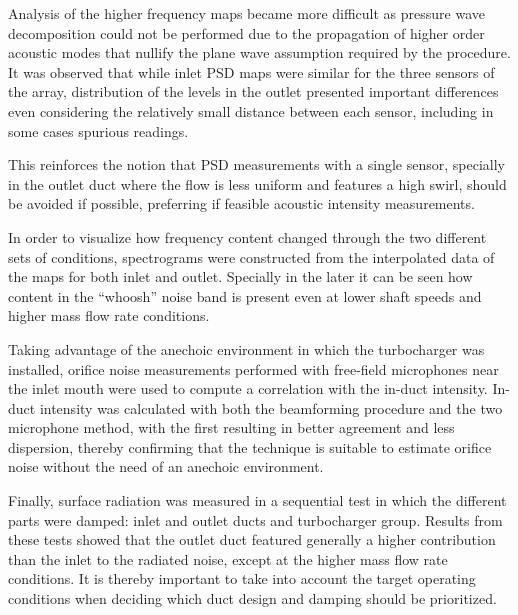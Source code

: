 Analysis of the higher frequency maps became more difficult as pressure wave decomposition could not be performed due to the propagation of higher order acoustic modes that nullify the plane wave assumption required by the procedure. It was observed that while inlet PSD maps were similar for the three sensors of the array, distribution of the levels in the outlet presented important differences even considering the relatively small distance between each sensor, including in some cases spurious readings. 

This reinforces the notion that PSD measurements with a single sensor, specially in the outlet duct where the flow is less uniform and features a high swirl, should be avoided if possible, preferring if feasible acoustic intensity measurements.

In order to visualize how frequency content changed through the two different sets of conditions, spectrograms were constructed from the interpolated data of the maps for both inlet and outlet. Specially in the later it can be seen how content in the ``whoosh'' noise band is present even at lower shaft speeds and higher mass flow rate conditions. 

Taking advantage of the anechoic environment in which the turbocharger was installed, orifice noise measurements performed with free-field microphones near the inlet mouth were used to compute a correlation with the in-duct intensity. In-duct intensity was calculated with both the beamforming procedure and the two microphone method, with the first resulting in better agreement and less dispersion, thereby confirming that the technique is suitable to estimate orifice noise without the need of an anechoic environment.

Finally, surface radiation was measured in a sequential test in which the different parts were damped: inlet and outlet ducts and turbocharger group. Results from these tests showed that the outlet duct featured generally a higher contribution than the inlet to the radiated noise, except at the higher mass flow rate conditions. It is thereby important to take into account the target operating conditions when deciding which duct design and damping should be prioritized.